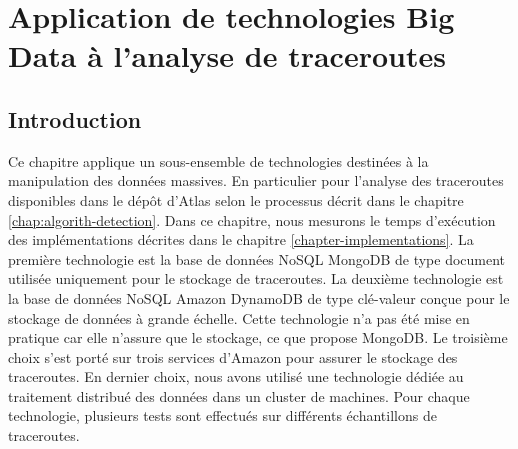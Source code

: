 \chapter{Application de  technologies Big Data à l'analyse de  traceroutes} \label{chap:application-on-traceroutes}


\section{Introduction}

Ce chapitre applique un sous-ensemble de  technologies destinées  à la manipulation des données massives. En particulier  pour l'analyse des traceroutes disponibles dans le dépôt d'Atlas selon le processus décrit dans le chapitre \ref{chap:algorith-detection}. Dans ce chapitre, nous mesurons le temps d'exécution  des  implémentations  décrites dans le chapitre \ref{chapter-implementations}.  
 La première technologie est la base de données NoSQL MongoDB de type document  utilisée uniquement pour le stockage de traceroutes. La deuxième technologie est la base de données NoSQL  Amazon DynamoDB de type clé-valeur conçue pour le stockage de données à grande échelle. Cette technologie n'a pas été  mise en pratique car elle n'assure que le stockage, ce que propose MongoDB.
 Le troisième choix s'est porté sur trois services d'Amazon pour assurer le stockage des traceroutes. En dernier choix, nous avons  utilisé une technologie dédiée  au traitement distribué des données dans un cluster de machines. Pour chaque technologie, plusieurs tests sont effectués sur différents échantillons de traceroutes.


 
